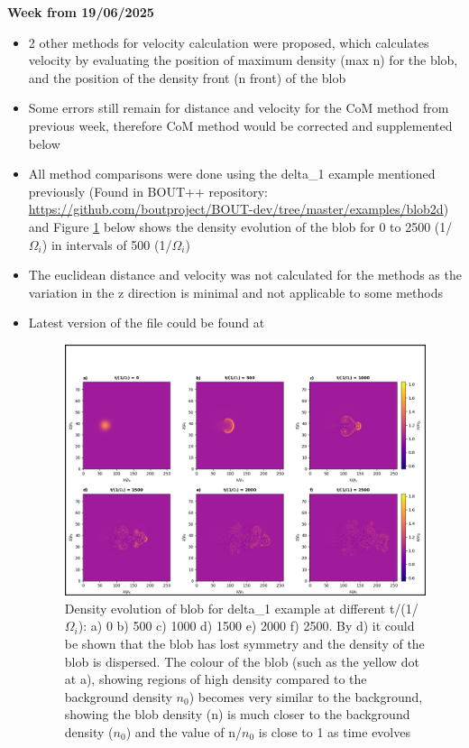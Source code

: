 \documentclass{article}
\begin{document}
\begin{arrowlist}
    \item \textbf{Week from 19/06/2025}
        \begin{itemize}
            \item 2 other methods for velocity calculation were proposed, which calculates velocity by evaluating the position of maximum density (max n) for the blob, and the position of the density front (n front) of the blob
            \item Some errors still remain for distance and velocity for the CoM method from previous week, therefore CoM method would be corrected and supplemented below
            \item All method comparisons were done using the delta\_1 example mentioned previously (Found in BOUT++ repository: \url{https://github.com/boutproject/BOUT-dev/tree/master/examples/blob2d}) and Figure \ref{fig:fig6} below shows the density evolution of the blob for 0 to 2500 (1/$\Omega_i$) in intervals of 500 (1/$\Omega_i$)
            \item The euclidean distance and velocity was not calculated for the methods as the variation in the z direction is minimal and not applicable to some methods
            \item Latest version of the file could be found at 

    \begin{figure}[H]
    \centering
        \includegraphics[height=0.5\textheight]{./Fig/Fig6 n hmap t0_t50}
        \normalsize{\caption{Density evolution of blob for delta\_1 example at different t/(1/$\Omega_i$): a) 0 b) 500 c) 1000 d) 1500 e) 2000 f) 2500. By d) it could be shown that the blob has lost symmetry and the density of the blob is dispersed. The colour of the blob (such as the yellow dot at a), showing regions of high density compared to the background density $n_0$) becomes very similar to the background, showing the blob density (n) is much closer to the background density ($n_0$) and the value of n/$n_0$ is close to 1 as time evolves}
        \label{fig:fig6}}
    \end{figure}   
            

\end{itemize}
\end{arrowlist}
\end{document}
